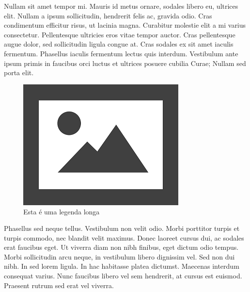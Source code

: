 \documentclass{article}
\begin{document}
Nullam sit amet tempor mi. Mauris id metus ornare, sodales libero eu, ultrices elit. Nullam a ipsum sollicitudin, hendrerit felis ac, gravida odio. Cras condimentum efficitur risus, ut lacinia magna. Curabitur molestie elit a mi varius consectetur. Pellentesque ultricies eros vitae tempor auctor. Cras pellentesque augue dolor, sed sollicitudin ligula congue at. Cras sodales ex sit amet iaculis fermentum. Phasellus iaculis fermentum lectus quis interdum. Vestibulum ante ipsum primis in faucibus orci luctus et ultrices posuere cubilia Curae; Nullam sed porta elit.

\begin{figure}[H]
	\centering
	\includegraphics[width=0.5\linewidth]{Figuras/fig3}
	\caption[Legenda curta]{Esta é uma legenda longa}
	\label{fig:fig3}
\end{figure}

Phasellus sed neque tellus. Vestibulum non velit odio. Morbi porttitor turpis et turpis commodo, nec blandit velit maximus. Donec laoreet cursus dui, ac sodales erat faucibus eget. Ut viverra diam non nibh finibus, eget dictum odio tempus. Morbi sollicitudin arcu neque, in vestibulum libero dignissim vel. Sed non dui nibh. In sed lorem ligula. In hac habitasse platea dictumst. Maecenas interdum consequat varius. Nunc faucibus libero vel sem hendrerit, at cursus est euismod. Praesent rutrum sed erat vel viverra. \cite{Sleep2021}	


\newpage
{}







	
\end{document}
